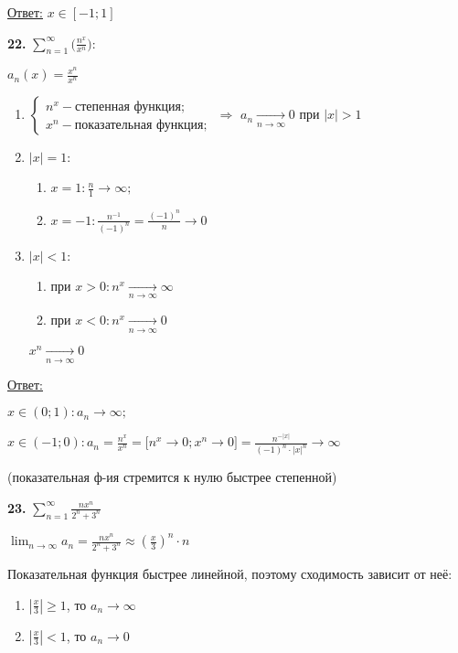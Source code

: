 \underline{Ответ:} $x \in [-1;1]$

\textbf{22.} $\sum_{n=1}^{\infty} \Big( \frac{n^x}{x^n} \Big):$

$a_n(x)=\frac{x^n}{x^n}$

\begin{enumerate}
	\item
	$
	\begin{cases}
		n^x - \text{степенная функция;} \\
		x^n - \text{показательная функция;}		
	\end{cases}
	$ 
	$\Longrightarrow$
	 $a_n \xrightarrow[n \to \infty]{} 0$ при $|x|>1$
	 \item $|x|=1:$
	 	\begin{enumerate}
		 	\item $x=1: \frac{n}{1} \longrightarrow \infty;$
		 	\item $x=-1: \frac{n^{-1}}{(-1)^n}=\frac{(-1)^n}{n}\longrightarrow 0$
	 	\end{enumerate}
	 \item $|x|<1:$
	       \begin{enumerate}
	       		\item при $x>0: n^x \xrightarrow[n \to \infty]{} \infty$
	       		\item при $x<0: n^x \xrightarrow[n \to \infty]{} 0$
	       \end{enumerate}
	       $x^n \xrightarrow[n \to \infty]{} 0$
\end{enumerate}
\underline{Ответ:} 

$x \in (0;1): a_n \longrightarrow \infty;$

$x \in (-1;0): a_n=\frac{n^x}{x^n}=
\Big[
	n^x \to 0;
	x^n \to 0	
\Big]=\frac{n^{-|x|}}{(-1)^n\cdot |x|^n} \longrightarrow \infty$

 (показательная ф-ия стремится к нулю быстрее степенной)



\textbf{23.} $\sum_{n=1}^{\infty} \frac{nx^n}{2^n+3^n}$

$\lim_{n \to \infty} a_n = \frac{nx^n}{2^n+3^n} \approx \left(\frac{x}{3}\right)^n \cdot n$

Показательная функция быстрее линейной, поэтому сходимость зависит от неё:
\begin{enumerate}
	\item $\left|\frac{x}{3}\right| \geq 1$, то $a_n \to \infty$
	\item $\left|\frac{x}{3}\right| < 1$, то $a_n \to 0$
\end{enumerate}

